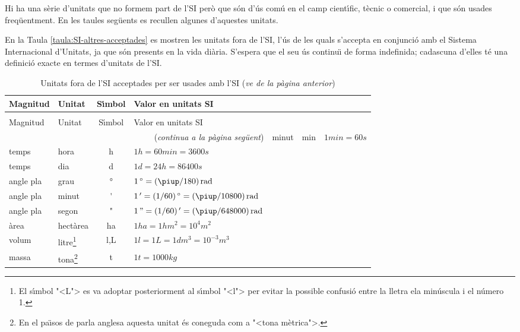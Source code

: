 Hi ha una s\`{e}rie d'unitats que no formem part de l'SI per\`{o} que s\'{o}n d'\'{u}s com\'{u} en el camp cient\'{\i}fic, t\`{e}cnic o comercial, i que s\'{o}n usades freq\"{u}entment. En les taules seg\"{u}ents es recullen algunes d'aquestes unitats.

En la Taula \vref{taula:SI-altres-acceptades} es mostren les unitats fora de l'SI, l'\'{u}s de les quals s'accepta en conjunci\'{o} amb el Sistema Internacional d'Unitats, ja que s\'{o}n presents en la vida di\`{a}ria. S'espera que el seu \'{u}s continu\"{\i} de forma indefinida; cadascuna d'elles t\'{e} una definici\'{o} exacte en termes d'unitats de l'SI.

\begin{longtable}[h]{llcl}
   \caption{\label{taula:SI-altres-acceptades} Unitats fora de l'SI acceptades per a ser usades amb l'SI  }\\
   \toprule[1pt]
    Magnitud & Unitat &  S\'{\i}mbol & Valor en unitats SI\\
   \midrule
   \endfirsthead
   \caption[]{Unitats fora de l'SI acceptades per ser usades amb l'SI (\emph{ve de la p\`{a}gina
   anterior})}\\
   \toprule[1pt]
    Magnitud & Unitat &  S\'{\i}mbol & Valor en unitats SI\\
   \midrule
   \endhead
   \midrule
   \multicolumn{4}{r}{(\emph{continua a la p\`{a}gina seg\"{u}ent})}
   \endfoot
   \endlastfoot
   temps & minut &  \unit{min}& $1\unit{min} = 60\unit{s}$ \\
   temps & hora & \unit{h} & $1\unit{h} = 60\unit{min} = 3600\unit{s}$ \\
   temps & dia & \unit{d} & $1\unit{d} = 24\unit{h} = 86400\unit{s}$\\
   angle pla & grau &  \unit{\degree} &   $1\unit{\degree} = (\piup/180)\unit{rad}$ \\
   angle pla & minut & \unit{'} & $1\unit{'} = (1/60)\unit{\degree} = (\piup/10800)\unit{rad}$ \\
   angle pla & segon & \unit{"} & $1\unit{"} = (1/60)\unit{'} = (\piup/648000)\unit{rad}$ \\
   \`{a}rea & hect\`{a}rea & \unit{ha} & $1\unit{ha} = 1\unit{hm^2} = 10^4\unit{m^2}$\\
   volum & litre\footnote{El s\'{\i}mbol {"<}L{">} es va adoptar posteriorment al s\'{\i}mbol {"<}l{">} per evitar la possible confusi\'{o} entre la lletra ela min\'{u}scula i  el n\'{u}mero 1.}& \unit{l},\unit{L} & $1\unit{l} = 1\unit{L} = 1\unit{dm^3} = 10^{-3}\unit{m^3}$ \\
   massa & tona\footnote{En el pa\"{\i}sos de parla anglesa aquesta unitat \'{e}s coneguda com a {"<}tona m\`{e}trica{">}.} & \unit{t} & $1\unit{t} =1000\unit{kg}$\\
   \bottomrule[1pt]
\end{longtable}
\index{$\degree$}

